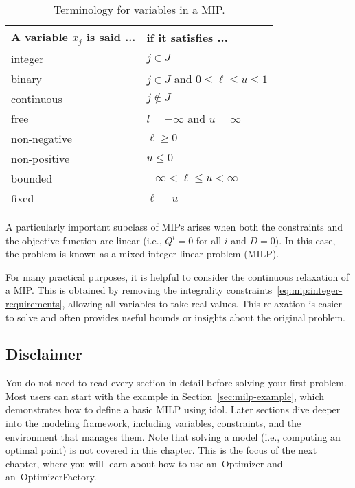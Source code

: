 \begin{table}
    \caption{Terminology for variables in a MIP.}
    \label{tab:var-types}
    \begin{tabular}{ll}
        \toprule
        A variable $x_j$ is said ... & if it satisfies ... \\\midrule
        integer & $j\in J$ \\
        binary & $j\in J$ and $0 \le \ell \le u \le 1$ \\
        continuous & $j\notin J$ \\\midrule
        free & $l=-\infty$ and $u = \infty$ \\
        non-negative & $\ell \ge 0$ \\
        non-positive & $u \le 0$ \\
        bounded &  $-\infty < \ell \le u < \infty$ \\
        fixed &  $\ell = u$ \\\bottomrule
    \end{tabular}
\end{table}

A particularly important subclass of MIPs arises when both the constraints and
the objective function are linear (i.e., $Q^i = 0$ for all $i$ and $D = 0$).
In this case, the problem is known as a mixed-integer linear problem (MILP).

For many practical purposes, it is helpful to consider the continuous
relaxation of a MIP. This is obtained by removing the integrality
constraints~\eqref{eq:mip:integer-requirements}, allowing all variables to
take real values. This relaxation is easier to solve and often provides useful
bounds or insights about the original problem.

\subsection*{Disclaimer}
You do not need to read every section in detail before solving your first
problem. Most users can start with the example in
Section~\ref{sec:milp-example}, which demonstrates how to define a basic MILP
using \textsf{idol}. Later sections dive deeper into the modeling framework,
including variables, constraints, and the environment that manages them.
%
Note that solving a model (i.e., computing an optimal point) is not covered in
this chapter. This is the focus of the next chapter, where you will learn
about how to use an~\textsf{Optimizer} and an~\textsf{OptimizerFactory}.

